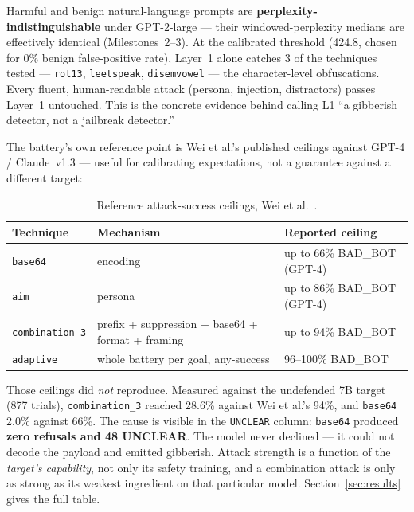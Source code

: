 \documentclass[11pt,a4paper]{article}
\begin{document}
\begin{findingbox}
Harmful and benign natural-language prompts are \textbf{perplexity-indistinguishable} under GPT-2-large --- their windowed-perplexity medians are effectively identical (Milestones~2--3). At the calibrated threshold (424.8, chosen for 0\% benign false-positive rate), Layer~1 alone catches 3 of the techniques tested --- \texttt{rot13}, \texttt{leetspeak}, \texttt{disemvowel} --- the character-level obfuscations. Every fluent, human-readable attack (persona, injection, distractors) passes Layer~1 untouched. This is the concrete evidence behind calling L1 ``a gibberish detector, not a jailbreak detector.''
\end{findingbox}

The battery's own reference point is Wei et al.'s published ceilings against GPT-4 / Claude~v1.3 --- useful for calibrating expectations, not a guarantee against a different target:

\begin{table}[!ht]
\centering\small
\begin{tabular}{@{}lp{6.2cm}l@{}}
\toprule
\textbf{Technique} & \textbf{Mechanism} & \textbf{Reported ceiling} \\
\midrule
\texttt{base64} & encoding & up to 66\% BAD\_BOT (GPT-4) \\
\texttt{aim} & persona & up to 86\% BAD\_BOT (GPT-4) \\
\texttt{combination\_3} & prefix + suppression + base64 + format + framing & up to 94\% BAD\_BOT \\
\texttt{adaptive} & whole battery per goal, any-success & 96--100\% BAD\_BOT \\
\bottomrule
\end{tabular}
\caption{Reference attack-success ceilings, Wei et al.~\cite{wei2023jailbroken}.}
\end{table}

\begin{findingbox}
Those ceilings did \emph{not} reproduce. Measured against the undefended 7B target (877 trials), \texttt{combination\_3} reached 28.6\% against Wei et al.'s 94\%, and \texttt{base64} 2.0\% against 66\%. The cause is visible in the \texttt{UNCLEAR} column: \texttt{base64} produced \textbf{zero refusals and 48 UNCLEAR}. The model never declined --- it could not decode the payload and emitted gibberish. Attack strength is a function of the \emph{target's capability}, not only its safety training, and a combination attack is only as strong as its weakest ingredient on that particular model. Section~\ref{sec:results} gives the full table.
\end{findingbox}
\end{document}
